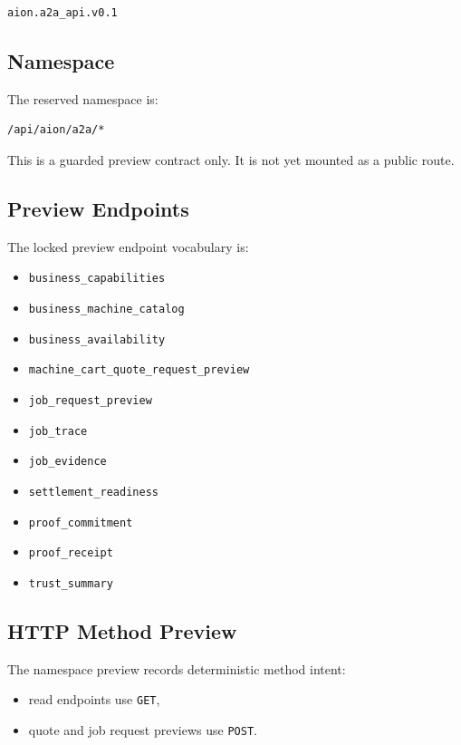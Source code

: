 \begin{verbatim}
aion.a2a_api.v0.1
\end{verbatim}

\subsection{Namespace}

The reserved namespace is:

\begin{verbatim}
/api/aion/a2a/*
\end{verbatim}

This is a guarded preview contract only. It is not yet mounted as a public route.

\subsection{Preview Endpoints}

The locked preview endpoint vocabulary is:

\begin{itemize}
  \item \texttt{business\_capabilities}
  \item \texttt{business\_machine\_catalog}
  \item \texttt{business\_availability}
  \item \texttt{machine\_cart\_quote\_request\_preview}
  \item \texttt{job\_request\_preview}
  \item \texttt{job\_trace}
  \item \texttt{job\_evidence}
  \item \texttt{settlement\_readiness}
  \item \texttt{proof\_commitment}
  \item \texttt{proof\_receipt}
  \item \texttt{trust\_summary}
\end{itemize}

\subsection{HTTP Method Preview}

The namespace preview records deterministic method intent:

\begin{itemize}
  \item read endpoints use \texttt{GET},
  \item quote and job request previews use \texttt{POST}.
\end{itemize}

